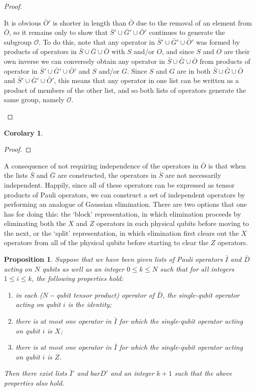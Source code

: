 \documentclass[twocolumn,showpacs,preprintnumbers,amsmath,amssymb,nofootinbib,pra,floatfix]{revtex4}
\newtheorem{proposition}{Proposition}
\newtheorem{corolary}{Corolary}
\begin{document}
\begin{proof}
\begin{description}
It is obvious $\bar O'$ is shorter in length than $\bar O$ due to the removal of an element from $\bar O$, so it remains only to show that $\bar S' \cup \bar G' \cup \bar O'$ continues to generate the subgroup $\mathcal{O}$.  To do this, note that any operator in $\bar S' \cup \bar G' \cup \bar O'$ was formed by products of operators in $\bar S \cup \bar G \cup \bar O$ with $S$ and/or $O$, and since $S$ and $O$ are their own inverse we can conversely obtain any operator in $\bar S \cup \bar G \cup \bar O$ from products of operator in $\bar S' \cup \bar G' \cup \bar O'$ and $S$ and/or $G$.  Since $S$ and $G$ are in both $\bar S \cup \bar G \cup \bar O$ and $\bar S' \cup \bar G' \cup \bar O'$, this means that any operator in one list can be written as a product of members of the other list, and so both lists of operators generate the same group, namely $\mathcal{O}$.
\end{description}
\end{proof}

\begin{corolary}
\end{corolary}

\begin{proof}
\end{proof}

A consequence of not requiring independence of the operators in $\bar O$ is that when the lists $\bar S$ and $\bar G$ are constructed, the operators in $\bar S$ are not necessarily independent.  Happily, since all of these operators can be expressed as tensor products of Pauli operators, we can construct a set of independent operators by performing an analogue of Gaussian elimination.  There are two options that one has for doing this:  the `block' representation, in which elimination proceeds by eliminating both the $X$ and $Z$ operators in each physical qubits before moving to the next, or the `split' representation, in which elimination first clears out the $X$ operators from all of the physical qubits before starting to clear the $Z$ operators.

\begin{proposition}
Suppose that we have been given lists of Pauli operators $\bar I$ and $\bar D$ acting on $N$ qubits as well as an integer $0\le k\le N$ such that for all integers $1 \le i \le k$, the following properties hold:
\begin{enumerate}
\item in each ($N-$qubit tensor product) operator of $\bar D$, the single-qubit operator acting on qubit $i$ is the identity;
\item there is at most one operator in $\bar I$ for which the single-qubit operator acting on qubit $i$ is $X$;
\item there is at most one operator in $\bar I$ for which the single-qubit operator acting on qubit $i$ is $Z$.
\end{enumerate}
Then there exist lists $\bar I'$ and $bar D'$ and an integer $k+1$ such that the above properties also hold.
\end{proposition}
\end{document}
